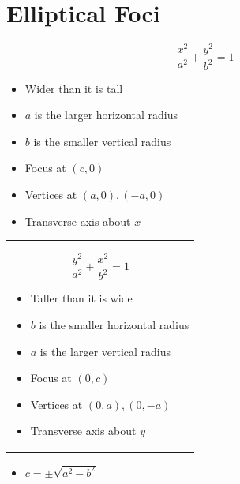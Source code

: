 \documentclass[12pt]{article}
\begin{document}
\section{Elliptical Foci}
\begin{minipage}{0.5\textwidth}
$$\frac{x^2}{a^2} + \frac{y^2}{b^2} = 1$$
\begin{itemize}
    \item Wider than it is tall
    \item $a$ is the larger horizontal radius
    \item $b$ is the smaller vertical radius
    \item Focus at $(c,0)$
    \item Vertices at $(a,0), (-a,0)$
    \item Transverse axis about $x$
\end{itemize}

\end{minipage}
\begin{minipage}{0.45\textwidth}
\begin{tabular}{|p{\textwidth}}

$$\frac{y^2}{a^2} + \frac{x^2}{b^2} = 1$$
\begin{itemize}
    \item Taller than it is wide
    \item $b$ is the smaller horizontal radius
    \item $a$ is the larger vertical radius
    \item Focus at $(0,c)$
    \item Vertices at $(0,a), (0,-a)$
    \item Transverse axis about $y$
\end{itemize}

\end{tabular}
\end{minipage}

\begin{itemize}    \item $c=\pm\sqrt{a^2-b^2}$
\end{itemize}
\end{document}
